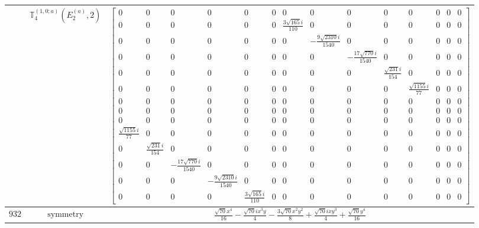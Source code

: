 \documentclass[fleqn,8pt,landscape]{jsarticle}
\begin{document}
\begin{longtable}{ccc}
$  $ & $ \mathbb{T}_{4}^{(1,0;a)}(E_{2}^{(a)},2) $ & $ \begin{bmatrix} 0 & 0 & 0 & 0 & 0 & 0 & 0 & 0 & 0 & 0 & 0 & 0 & 0 & 0 \\ 0 & 0 & 0 & 0 & 0 & 0 & \frac{3 \sqrt{165} i}{110} & 0 & 0 & 0 & 0 & 0 & 0 & 0 \\ 0 & 0 & 0 & 0 & 0 & 0 & 0 & - \frac{9 \sqrt{2310} i}{1540} & 0 & 0 & 0 & 0 & 0 & 0 \\ 0 & 0 & 0 & 0 & 0 & 0 & 0 & 0 & - \frac{17 \sqrt{770} i}{1540} & 0 & 0 & 0 & 0 & 0 \\ 0 & 0 & 0 & 0 & 0 & 0 & 0 & 0 & 0 & \frac{\sqrt{231} i}{154} & 0 & 0 & 0 & 0 \\ 0 & 0 & 0 & 0 & 0 & 0 & 0 & 0 & 0 & 0 & \frac{\sqrt{1155} i}{77} & 0 & 0 & 0 \\ 0 & 0 & 0 & 0 & 0 & 0 & 0 & 0 & 0 & 0 & 0 & 0 & 0 & 0 \\ 0 & 0 & 0 & 0 & 0 & 0 & 0 & 0 & 0 & 0 & 0 & 0 & 0 & 0 \\ 0 & 0 & 0 & 0 & 0 & 0 & 0 & 0 & 0 & 0 & 0 & 0 & 0 & 0 \\ \frac{\sqrt{1155} i}{77} & 0 & 0 & 0 & 0 & 0 & 0 & 0 & 0 & 0 & 0 & 0 & 0 & 0 \\ 0 & \frac{\sqrt{231} i}{154} & 0 & 0 & 0 & 0 & 0 & 0 & 0 & 0 & 0 & 0 & 0 & 0 \\ 0 & 0 & - \frac{17 \sqrt{770} i}{1540} & 0 & 0 & 0 & 0 & 0 & 0 & 0 & 0 & 0 & 0 & 0 \\ 0 & 0 & 0 & - \frac{9 \sqrt{2310} i}{1540} & 0 & 0 & 0 & 0 & 0 & 0 & 0 & 0 & 0 & 0 \\ 0 & 0 & 0 & 0 & \frac{3 \sqrt{165} i}{110} & 0 & 0 & 0 & 0 & 0 & 0 & 0 & 0 & 0 \end{bmatrix} $ \\ \hline
$ 932 $ & $ \text{symmetry} $ & $ \frac{\sqrt{70} x^{4}}{16} - \frac{\sqrt{70} i x^{3} y}{4} - \frac{3 \sqrt{70} x^{2} y^{2}}{8} + \frac{\sqrt{70} i x y^{3}}{4} + \frac{\sqrt{70} y^{4}}{16} $ \\

\end{longtable}
\end{document}
